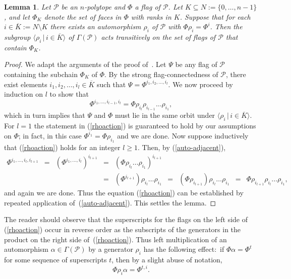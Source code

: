 \documentclass[12pt]{article}
\renewcommand{\bar}{\overline}
\renewcommand{\>}{\rangle}
\renewcommand{\geq}{\geqslant}
\newtheorem{lemma}[theorem]{Lemma}
\theoremstyle{definition}\newtheorem{definition}{Definition}[section]
\begin{document}
\begin{lemma}
\label{rhoex}
Let $\mathcal{P}$ be an $n$-polytope and $\Phi$ a flag of $\mathcal{P}$. Let $K\subseteq N:=\{0,\ldots,n-1\}$, and let $\Phi_K$ denote the set of faces in $\Phi$ with ranks in $K$. Suppose that for each $i\in\bar{K}:= N\setminus K$ there exists an automorphism $\rho_i$ of $\mathcal{P}$ with $\Phi\rho_{i}=\Phi^{i}$. Then the subgroup $\langle\rho_{i}\,|\,i\in \bar{K}\rangle$ of $\Gamma(\mathcal{P})$ acts transitively on the set of flags of $\mathcal{P}$ that contain $\Phi_K$.
\end{lemma}

\begin{proof}
We adapt the arguments of the proof of~\cite[Prop.\,2B4]{MS2002}. Let $\Psi$ be any flag of $\mathcal{P}$ containing the subchain $\Phi_K$ of $\Phi$. By the strong flag-connectedness of $\mathcal{P}$, there exist elements $i_1, i_2, \dots, i_l \in \bar{K}$ such that $\Psi=\Phi^{i_1, i_2, \dots, i_l}$. We now proceed by induction on $l$ to show that 
\begin{equation}
\label{rhoaction}
\Phi^{i_1,\dots,i_{l-1},i_l} = \Phi\rho_{i_l}\rho_{i_{l-1}}\dots \rho_{i_1},
\end{equation}
which in turn implies that $\Psi$ and $\Phi$ must lie in the same orbit under $\langle\rho_{i}\,|\,i\in \bar{K}\rangle$. For $l=1$ the statement in (\ref{rhoaction}) is guaranteed to hold by our assumptions on $\Phi$; in fact, in this case $\Phi^{i_1}=\Phi\rho_{i_1}$ and we are done. Now suppose inductively that (\ref{rhoaction}) holds for an integer $l\geq 1$. Then, by (\ref{auto-adjacent}), 
\[\begin{array}{lllllllll}
\Phi^{i_1,\dots, i_l,i_{l+1}}\!&\!\!=\!\!&\!(\Phi^{i_1,\dots, i_l})^{i_{l+1}} \!&\!\!=\!\!&\! (\Phi\rho_{i_{l}}\dots \rho_{i_1})^{i_{l+1}}\!&&& \\[.03in]
&&&\!\!=\!\! &\!(\Phi^{i_{l+1}})\rho_{i_{l}}\dots \rho_{i_1}\! &\!\!=\!\!&\! (\Phi\rho_{i_{l+1}})\rho_{i_{l}}\dots \rho_{i_1}\!&\!\!=\!\!&\! \Phi\rho_{i_{l+1}}\rho_{i_{l}}\dots \rho_{i_1},
\end{array}\]
and again we are done. Thus the equation (\ref{rhoaction}) can be established by repeated application of~(\ref{auto-adjacent}). This settles the lemma.
\end{proof}

The reader should observe that the superscripts for the flags on the left side of (\ref{rhoaction}) occur in reverse order as the subscripts of the generators in the product on the right side of~(\ref{rhoaction}). Thus left multiplication of an automorphism $\alpha\in\Gamma(\mathcal{P})$ by a generator $\rho_i$ has the following effect:\ if $\Phi\alpha=\Phi^t$ for some sequence of superscripts $t$, then by a slight abuse of notation, 
\[ \Phi\rho_{i}\alpha = \Phi^{t,i} .\]
\end{document}
